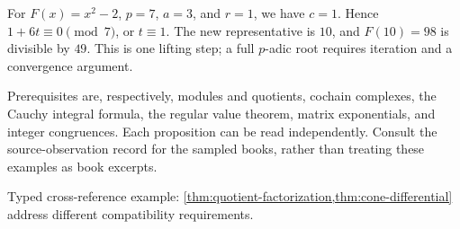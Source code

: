 \documentclass[11pt,a4paper]{article}
\begin{document}
For $F(x)=x^2-2$, $p=7$, $a=3$, and $r=1$, we have $c=1$. Hence $1+6t\equiv0\pmod7$, or $t\equiv1$. The new representative is $10$, and $F(10)=98$ is divisible by $49$. This is one lifting step; a full $p$-adic root requires iteration and a convergence argument.

\medskip\noindent\small Prerequisites are, respectively, modules and quotients, cochain complexes, the Cauchy integral formula, the regular value theorem, matrix exponentials, and integer congruences. Each proposition can be read independently. Consult the source-observation record for the sampled books, rather than treating these examples as book excerpts.

\par\smallskip\noindent\small Typed cross-reference example: \cref{thm:quotient-factorization,thm:cone-differential} address different compatibility requirements.
\end{document}
